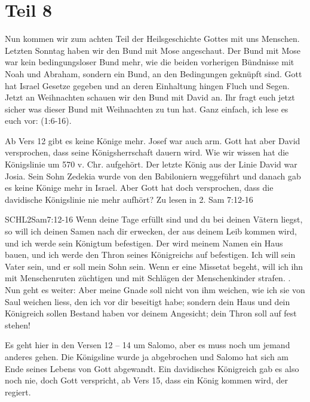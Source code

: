 \section{Teil 8}
\begin{otsblock}[Einführung]
    Nun kommen wir zum achten Teil der Heilsgeschichte Gottes mit uns Menschen. Letzten Sonntag haben wir den Bund mit Mose angeschaut. Der Bund mit Mose war kein bedingungsloser Bund mehr, wie die beiden vorherigen Bündnisse mit Noah und Abraham, sondern ein Bund, an den Bedingungen geknüpft sind. Gott hat Israel Gesetze gegeben und an deren Einhaltung hingen Fluch und Segen. Jetzt an Weihnachten schauen wir den Bund mit David an. Ihr fragt euch jetzt sicher was dieser Bund mit Weihnachten zu tun hat. Ganz einfach, ich lese es euch vor: (1:6-16).

    Ab Vers 12 gibt es keine Könige mehr. Josef war auch arm. Gott hat aber David versprochen, dass seine Königsherrschaft  dauern wird. Wie wir wissen hat die Königslinie um 570 v. Chr. aufgehört. Der letzte König aus der Linie David war Josia. Sein Sohn Zedekia wurde von den Babiloniern weggeführt und danach gab es keine Könige mehr in Israel. Aber Gott hat doch versprochen, dass die davidische Königslinie nie mehr aufhört? Zu lesen in 2. Sam 7:12-16
    \begin{bibelbox}{SCHL}{2Sam}{7:12-16}
        Wenn deine Tage erfüllt sind und du bei deinen Vätern liegst, so will ich deinen Samen nach dir erwecken, der aus deinem Leib kommen wird, und ich werde sein Königtum befestigen. Der wird meinem Namen ein Haus bauen, und ich werde den Thron seines Königreichs auf  befestigen. Ich will sein Vater sein, und er soll mein Sohn sein. Wenn er eine Missetat begeht, will ich ihn mit Menschenruten züchtigen und mit Schlägen der Menschenkinder strafen. . Nun geht es weiter:
        Aber meine Gnade soll nicht von ihm weichen, wie ich sie von Saul weichen liess, den ich vor dir beseitigt habe; sondern dein Haus und dein Königreich sollen  Bestand haben vor deinem Angesicht; dein Thron soll auf  fest stehen!
    \end{bibelbox}
    Es geht hier in den Versen 12 -- 14 um Salomo, aber es muss noch um jemand anderes gehen. Die Königsline wurde ja abgebrochen und Salomo hat sich am Ende seines Lebens von Gott abgewandt. Ein  davidisches Königreich gab es also noch nie, doch Gott verspricht, ab Vers 15, dass ein König kommen wird, der  regiert.

\end{otsblock}
